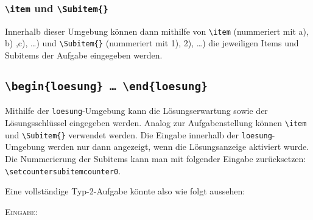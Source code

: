 \documentclass[a4paper,12pt]{article}
\begin{document}
\subsubsection{\texttt{\textbackslash item} und \texttt{\textbackslash Subitem\{\}}}
Innerhalb dieser Umgebung können dann mithilfe von \texttt{\textbackslash item} (nummeriert mit a), b) ,c), \ldots) und \texttt{\textbackslash Subitem\{\}} (nummeriert mit 1), 2), \ldots) die jeweiligen Items und Subitems der Aufgabe eingegeben werden. \leer


\subsection{\texttt{\textbackslash begin\{loesung\} \ldots\ \textbackslash end\{loesung\}}}
Mithilfe der \texttt{loesung}-Umgebung kann die Lösungserwartung sowie der Lösungsschlüssel eingegeben werden. Analog zur Aufgabenstellung können \texttt{\textbackslash item} und \texttt{\textbackslash Subitem\{\}} verwendet werden. Die Eingabe innerhalb der \texttt{loesung}-Umgebung werden nur dann angezeigt, wenn die Lösungsanzeige aktiviert wurde. Die Nummerierung der Subitems kann man mit folgender Eingabe zurücksetzen: \texttt{\textbackslash setcounter{subitemcounter}{0}}.\leer

Eine vollständige Typ-2-Aufgabe könnte also wie folgt aussehen:

\textsc{Eingabe:}
\end{document}
